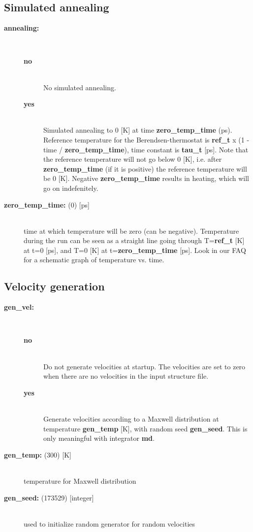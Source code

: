 \subsection{Simulated annealing}
\begin{description}
\item[{\bf annealing:}]\mbox{}\\
\vspace{-2ex}\begin{description}
\item[{\bf no}]\mbox{}\\
No simulated annealing. 
\item[{\bf yes}]\mbox{}\\
Simulated annealing to 0 [K] at time {\bf zero\_temp\_time} (ps).
Reference temperature for the Berendsen-thermostat is
{\bf ref\_t} x (1 - time / {\bf zero\_temp\_time}),
time constant is {\bf tau\_t} [ps]. Note that the reference temperature
will not go below 0 [K], i.e. after {\bf zero\_temp\_time} (if it is positive) 
the reference temperature will be 0 [K]. Negative {\bf zero\_temp\_time} 
results in heating, which will go on indefenitely.
\end{description}
\item[{\bf zero\_temp\_time: }(0) {[ps]}]\mbox{}\\
time at which temperature will be zero (can be negative). Temperature
during the run can be seen as a straight line going through 
T={\bf ref\_t} [K] at t=0 [ps], and 
T=0 [K] at t={\bf zero\_temp\_time} [ps]. Look in our 
FAQ for a schematic 
graph of temperature vs. time.
\end{description}

\subsection{Velocity generation}
\begin{description}
\item[{\bf gen\_vel:}]\mbox{}\\
\vspace{-2ex}\begin{description}
\item[{\bf no}]\mbox{}\\
 Do not generate velocities at startup. The velocities are set to zero
when there are no velocities in the input structure file.
\item[{\bf yes}]\mbox{}\\
Generate velocities according to a Maxwell distribution at
temperature {\bf gen\_temp} [K], with random seed {\bf gen\_seed}. 
This is only meaningful with integrator {\bf md}.
\end{description}
\item[{\bf gen\_temp: }(300) {[K]}]\mbox{}\\
temperature for Maxwell distribution
\item[{\bf gen\_seed: }(173529) {[integer]}]\mbox{}\\
used to initialize random generator for random velocities
\end{description}

